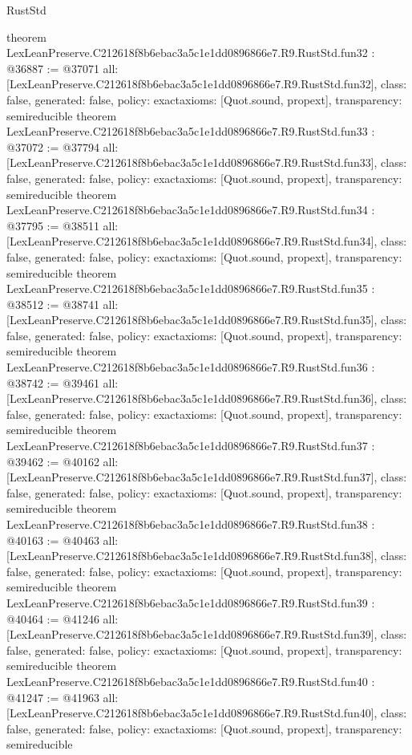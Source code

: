 \begin{lexlean}{RustStd}
\begin{coremodule}
{}
theorem LexLeanPreserve.C212618f8b6ebac3a5c1e1dd0896866e7.R9.RustStd.fun32 : @36887 := @37071 {
  all: [LexLeanPreserve.C212618f8b6ebac3a5c1e1dd0896866e7.R9.RustStd.fun32],
  class: false,
  generated: false,
  policy: exact{axioms: [Quot.sound, propext]},
  transparency: semireducible
}
theorem LexLeanPreserve.C212618f8b6ebac3a5c1e1dd0896866e7.R9.RustStd.fun33 : @37072 := @37794 {
  all: [LexLeanPreserve.C212618f8b6ebac3a5c1e1dd0896866e7.R9.RustStd.fun33],
  class: false,
  generated: false,
  policy: exact{axioms: [Quot.sound, propext]},
  transparency: semireducible
}
theorem LexLeanPreserve.C212618f8b6ebac3a5c1e1dd0896866e7.R9.RustStd.fun34 : @37795 := @38511 {
  all: [LexLeanPreserve.C212618f8b6ebac3a5c1e1dd0896866e7.R9.RustStd.fun34],
  class: false,
  generated: false,
  policy: exact{axioms: [Quot.sound, propext]},
  transparency: semireducible
}
theorem LexLeanPreserve.C212618f8b6ebac3a5c1e1dd0896866e7.R9.RustStd.fun35 : @38512 := @38741 {
  all: [LexLeanPreserve.C212618f8b6ebac3a5c1e1dd0896866e7.R9.RustStd.fun35],
  class: false,
  generated: false,
  policy: exact{axioms: [Quot.sound, propext]},
  transparency: semireducible
}
theorem LexLeanPreserve.C212618f8b6ebac3a5c1e1dd0896866e7.R9.RustStd.fun36 : @38742 := @39461 {
  all: [LexLeanPreserve.C212618f8b6ebac3a5c1e1dd0896866e7.R9.RustStd.fun36],
  class: false,
  generated: false,
  policy: exact{axioms: [Quot.sound, propext]},
  transparency: semireducible
}
theorem LexLeanPreserve.C212618f8b6ebac3a5c1e1dd0896866e7.R9.RustStd.fun37 : @39462 := @40162 {
  all: [LexLeanPreserve.C212618f8b6ebac3a5c1e1dd0896866e7.R9.RustStd.fun37],
  class: false,
  generated: false,
  policy: exact{axioms: [Quot.sound, propext]},
  transparency: semireducible
}
theorem LexLeanPreserve.C212618f8b6ebac3a5c1e1dd0896866e7.R9.RustStd.fun38 : @40163 := @40463 {
  all: [LexLeanPreserve.C212618f8b6ebac3a5c1e1dd0896866e7.R9.RustStd.fun38],
  class: false,
  generated: false,
  policy: exact{axioms: [Quot.sound, propext]},
  transparency: semireducible
}
theorem LexLeanPreserve.C212618f8b6ebac3a5c1e1dd0896866e7.R9.RustStd.fun39 : @40464 := @41246 {
  all: [LexLeanPreserve.C212618f8b6ebac3a5c1e1dd0896866e7.R9.RustStd.fun39],
  class: false,
  generated: false,
  policy: exact{axioms: [Quot.sound, propext]},
  transparency: semireducible
}
theorem LexLeanPreserve.C212618f8b6ebac3a5c1e1dd0896866e7.R9.RustStd.fun40 : @41247 := @41963 {
  all: [LexLeanPreserve.C212618f8b6ebac3a5c1e1dd0896866e7.R9.RustStd.fun40],
  class: false,
  generated: false,
  policy: exact{axioms: [Quot.sound, propext]},
  transparency: semireducible
}
\end{coremodule}
\end{lexlean}
